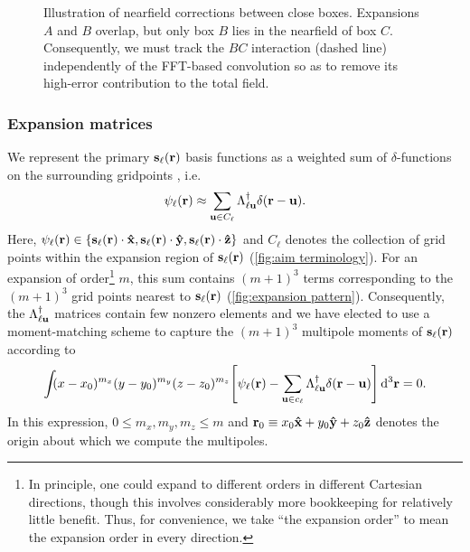 \begin{figure}
  \centering
  \caption{\label{fig:nearfield correction}Illustration of nearfield corrections between close boxes.
    Expansions $A$ and $B$ overlap, but only box $B$ lies in the nearfield of box $C$.
    Consequently, we must track the $BC$ interaction (dashed line) independently of the FFT-based convolution so as to remove its high-error contribution to the total field.
  }
\end{figure}

\subsubsection{\label{sec:expansion matrices}Expansion matrices}

We represent the primary $\vb{s}_\ell(\vb{r})$ basis functions as a weighted sum of $\delta$-functions on the surrounding gridpoints , i.e.
\begin{equation}
  \psi_\ell(\vb{r}) \approx \sum_{\vb{u} \in C_\ell} \Lambda_{\ell\vb{u}}^\dagger \delta(\vb{r} - \vb{u}).
  \label{eq:grid linear combination}
\end{equation}
Here, $\psi_\ell(\vb{r}) \in \qty{\vb{s}_\ell(\vb{r})\cdot \vu{x}, \vb{s}_\ell(\vb{r}) \cdot \vu{y}, \vb{s}_\ell(\vb{r}) \cdot \vu{z}}$ and $C_\ell$ denotes the collection of grid points within the expansion region of $\vb{s}_\ell(\vb{r})$ (\cref{fig:aim terminology}).
For an expansion of order\footnote{In principle, one could expand to different orders in different Cartesian directions, though this involves considerably more bookkeeping for relatively little benefit. Thus, for convenience, we take ``the expansion order'' to mean the expansion order in every direction.} $m$, this sum contains $(m + 1)^3$ terms corresponding to the $(m + 1)^3$ grid points nearest to $\vb{s}_\ell(\vb{r})$ (\cref{fig:expansion pattern}).
Consequently, the $\Lambda_{\ell \vb{u}}^\dagger$ matrices contain few nonzero elements and we have elected to use a moment-matching scheme to capture the $(m + 1)^3$ multipole moments of $\vb{s}_\ell(\vb{r})$ according to
\begin{equation}
  \int_{} \kern0.1em (x - x_0)^{m_x}(y - y_0)^{m_y}(z - z_0)^{m_z} \qty[\psi_\ell(\vb{r}) - \sum_{\vb{u} \in c_\ell} \Lambda_{\ell\vb{u}}^\dagger \delta(\vb{r} - \vb{u})] \dd[3]{\vb{r}} = 0.
  \label{eq:moment matching}
\end{equation}
In this expression, $0 \leqslant m_x, m_y, m_z \leqslant m$ and $\vb{r}_0 \equiv x_0 \vu{x} + y_0 \vu{y} + z_0\vu{z}$ denotes the origin about which we compute the multipoles.
